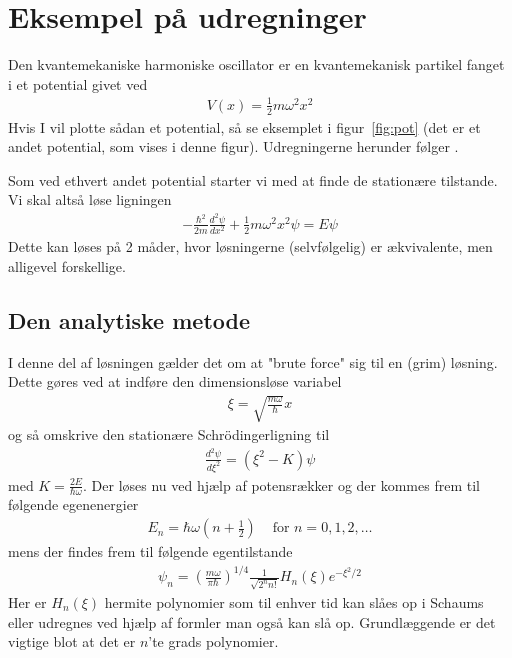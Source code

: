 \documentclass[danish,a4paper,oneside,onecolumn,article,11pt]{memoir}
\begin{document}
\chapter{Eksempel på udregninger}
Den kvantemekaniske harmoniske oscillator er en kvantemekanisk
partikel fanget i et potential givet ved
\begin{align}
V(x) = \frac{1}{2} m \omega^2 x^2
\end{align}
Hvis I vil plotte sådan et potential, så se eksemplet i
figur~\ref{fig:pot} (det er et andet potential, som vises i denne
figur). Udregningerne herunder følger \cite{griff}.

Som ved ethvert andet potential starter vi med at finde de stationære tilstande. Vi skal altså løse ligningen
\begin{align}
-\frac{\hbar^2}{2m} \frac{d^2 \psi}{dx^2} + \frac{1}{2}m\omega^2x^2\psi = E\psi
\end{align}
Dette kan løses på 2 måder, hvor løsningerne (selvfølgelig) er
ækvivalente, men alligevel forskellige.

\section{Den analytiske metode}
I denne del af løsningen gælder det om at "brute force" sig til en
(grim) løsning. Dette gøres ved at indføre den dimensionsløse variabel
\begin{align}
\xi = \sqrt{\frac{m\omega}{\hbar}} x
\end{align}
og så omskrive den stationære Schrödingerligning til
\begin{align}
\frac{d^2 \psi}{d \xi^2} = (\xi^2 - K)\psi
\end{align}
med $K = \frac{2E}{\hbar\omega}$. Der løses nu ved hjælp af
potensrækker og der kommes frem til følgende egenenergier
\begin{align}
E_n = \hbar\omega\left( n + \frac{1}{2} \right) & \text{ for } n = 0,1,2, \dots
\end{align}
mens der findes frem til følgende egentilstande
\begin{align}
\psi_n = \left( \frac{m\omega}{\pi \hbar} \right)^{1/4}
        \frac{1}{\sqrt{2^n n!}} H_n (\xi) e^{-\xi^2/2}
\end{align}
Her er $H_n(\xi)$ hermite polynomier som til enhver tid kan slåes op i
Schaums \cite{schaums} eller udregnes ved hjælp af formler man også
kan slå op. Grundlæggende er det vigtige blot at det er $n$'te grads
polynomier.
\end{document}
